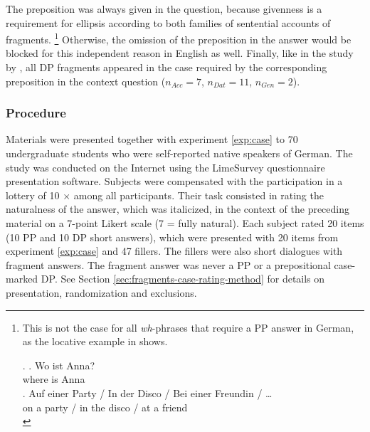 The preposition was always given in the question, because givenness is a requirement for ellipsis according to both families of sentential accounts of fragments.%
%
\footnote{This is not the case for all \textit{wh}-phrases that require a PP answer in German, as the locative example in \Next shows.

\ex. \ag. Wo ist Anna?\\
      where is Anna\\
      \bg. Auf einer Party / In der Disco / Bei einer Freundin / \dots\\
	on a party / in the disco / at a friend \mbox{} \mbox{}\\

 }\afterfn%
%
Otherwise, the omission of the preposition in the answer would be blocked for this independent reason in English as well. Finally, like in the study by \citet{merchant.etal2013}, all DP fragments appeared in the case required by the corresponding preposition in the context question ($n_{Acc} = 7$, $n_{Dat} = 11$, $n_{Gen} = 2$).

\subsubsection{Procedure}
\label{sec:pstranding-german-method}
Materials were presented together with experiment \ref{exp:case} to 70 undergraduate students who were self-reported native speakers of German. The study was conducted on the Internet using the LimeSurvey questionnaire presentation software. Subjects were compensated with the participation in a lottery of 10 $\times$  among all participants. Their task consisted in rating the naturalness of the answer, which was italicized, in the context of the preceding material on a 7-point Likert scale (7 = fully natural). Each subject rated 20 items (10 PP and 10 DP short answers), which were presented with 20 items from experiment \ref{exp:case} and 47 fillers. The fillers were also short dialogues with fragment answers. The fragment answer was never a PP or a prepositional case-marked DP. See Section \ref{sec:fragments-case-rating-method} for details on presentation, randomization and exclusions.
     
